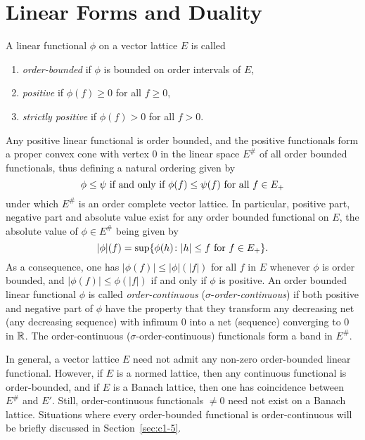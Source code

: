 \section{Linear Forms and Duality}\label{sec:c1-3}%
A linear functional $ \phi $ on a vector lattice $ E $ is called
\begin{enumerate}[\upshape (i)]

\item
\emph{order-bounded} if $ \phi $ is bounded on order intervals of $ E $,

\item
\emph{positive} if $ \phi(f) \geq 0 $ for all  $ f \geq 0 $, 

\item
\emph{strictly positive} if $ \phi(f) > 0 $ for all  $ f > 0 $.

\end{enumerate}
Any positive linear functional is order bounded, and the positive functionals form a proper convex cone with vertex $ 0 $ in the linear space $ E^{\#} $ of all order bounded functionals, thus defining a natural
ordering given by 
%
\[
	\text{$ \phi \leq \psi $ if and only if $ \phi(f) \leq \psi(f) $ for all $ f \in E_{+} $}
\]
%
under which $ E^{\#} $ is an order complete vector lattice.
In particular, positive part, negative part and absolute value exist for any order bounded functional on $ E $, the absolute value of $ \phi \in E^{\#} $ being given by
\[
	|\phi|(f) = \sup\{\phi(h) \colon |h| \leq f \text{ for $ f \in E_{+} $}\}.
\]
As a consequence, one has $ |\phi(f)| \leq |\phi|(|f|) $ for all $ f $ in $ E $ whenever $ \phi $ is order bounded, and $ |\phi(f)| \leq \phi(|f|) $ if and only if $ \phi $ is positive.
An order bounded linear functional $ \phi $ is called \emph{order-continuous} ($ \sigma $-\emph{order-continuous}) if both positive and negative part of $ \phi $ have the property that they transform any decreasing net (any decreasing sequence) with infimum $ 0 $ into a net (sequence) converging to $ 0 $ in $ \mathbb{R} $.
The order-continuous ($ \sigma $-order-continuous) functionals form a band in $ E^{\#} $.

In general, a vector lattice $ E $ need not admit any non-zero order-bounded linear functional.
However, if $ E $ is a normed lattice, then any continuous functional is order-bounded, and if $ E $ is a Banach lattice, then one has coincidence between $ E^{\#} $ and $ E' $.
Still, order-continuous functionals $ \neq 0 $ need not exist on a Banach lattice.
Situations where every order-bounded functional is order-continuous will be briefly discussed in Section~\ref{sec:c1-5}.

